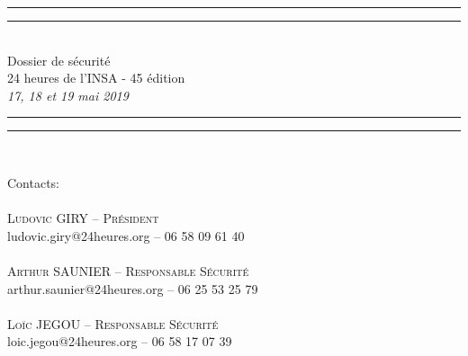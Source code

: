 \documentclass[hidelinks, paper=a4, fontsize=13pt]{report}
\begin{document}
\begin{center}
\rule[0.5ex]{\linewidth}{2pt}\vspace*{-\baselineskip}\vspace*{4.2pt}
\rule[0.5ex]{\linewidth}{1pt}\\[\baselineskip]
\huge Dossier de sécurité\\24 heures de l'INSA - 45 édition \\[4mm]
{\Large \textit{17, 18 et 19 mai 2019}}\\
\rule[0.5ex]{\linewidth}{1pt}\vspace*{-\baselineskip}\vspace{3.2pt}
\rule[0.5ex]{\linewidth}{2pt}\\
\vspace{20mm}
\end{center}
{\large Contacts:}\\
\vspace{3.5mm}
{\large\textsc{\\
Ludovic GIRY – Président\\}
ludovic.giry@24heures.org  – 06 58 09 61 40\\\\\textsc{
Arthur SAUNIER – Responsable Sécurité\\}
arthur.saunier@24heures.org – 06 25 53 25 79\\\\\textsc{
Loïc JEGOU – Responsable Sécurité\\}
loic.jegou@24heures.org  – 06 58 17 07 39\\\\}\\
\vspace{20mm}
\end{document}
